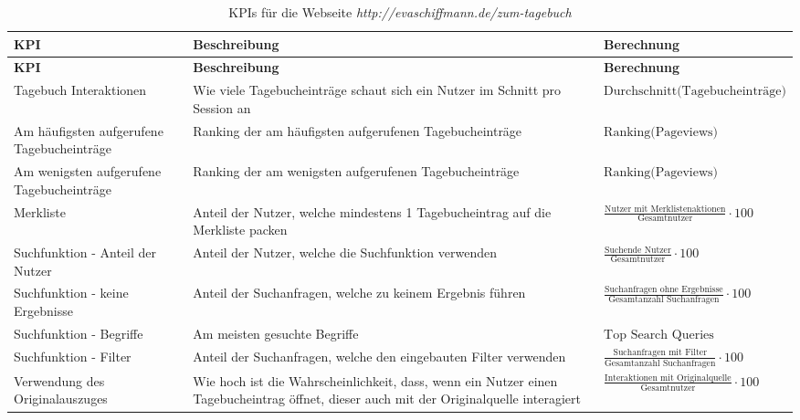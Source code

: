 \renewcommand{\arraystretch}{1.5} %
\begin{xltabular}{\textwidth}{|X|X|X|}
    \caption{KPIs für die Webseite \textit{http://evaschiffmann.de/zum-tagebuch}} \label{tab:kpi_tagebuch} \\
    \hline
    \textbf{KPI} & \textbf{Beschreibung} & \textbf{Berechnung} \\ \hline
    \endfirsthead

    \hline
    \textbf{KPI} & \textbf{Beschreibung} & \textbf{Berechnung} \\ \hline
    \endhead

    \hline
    \endfoot

    \hline
    \endlastfoot

    Tagebuch Interaktionen & Wie viele Tagebucheinträge schaut sich ein Nutzer im Schnitt pro Session an & {\footnotesize \(\text{Durchschnitt(Tagebucheinträge)}\)} \\ \hline
    Am häufigsten aufgerufene Tagebucheinträge & Ranking der am häufigsten aufgerufenen Tagebucheinträge & {\footnotesize \(\text{Ranking(Pageviews)}\)} \\ \hline
    Am wenigsten aufgerufene Tagebucheinträge & Ranking der am wenigsten aufgerufenen Tagebucheinträge & {\footnotesize \(\text{Ranking(Pageviews)}\)} \\ \hline
    Merkliste & Anteil der Nutzer, welche mindestens 1 Tagebucheintrag auf die Merkliste packen & {\footnotesize \(\frac{\text{Nutzer mit Merklistenaktionen}}{\text{Gesamtnutzer}} \cdot 100\)} \\ \hline
    Suchfunktion - Anteil der Nutzer & Anteil der Nutzer, welche die Suchfunktion verwenden & {\footnotesize \(\frac{\text{Suchende Nutzer}}{\text{Gesamtnutzer}} \cdot 100\)} \\ \hline
    Suchfunktion - keine Ergebnisse & Anteil der Suchanfragen, welche zu keinem Ergebnis führen & {\footnotesize \(\frac{\text{Suchanfragen ohne Ergebnisse}}{\text{Gesamtanzahl Suchanfragen}} \cdot 100\)} \\ \hline
    Suchfunktion - Begriffe & Am meisten gesuchte Begriffe & {\footnotesize \(\text{Top Search Queries}\)} \\ \hline
    Suchfunktion - Filter & Anteil der Suchanfragen, welche den eingebauten Filter verwenden & {\footnotesize \(\frac{\text{Suchanfragen mit Filter}}{\text{Gesamtanzahl Suchanfragen}} \cdot 100\)} \\ \hline
    Verwendung des Originalauszuges & Wie hoch ist die Wahrscheinlichkeit, dass, wenn ein Nutzer einen Tagebucheintrag öffnet, dieser auch mit der Originalquelle interagiert & {\footnotesize \(\frac{\text{Interaktionen mit Originalquelle}}{\text{Gesamtnutzer}} \cdot 100\)} \\ \hline
\end{xltabular}

